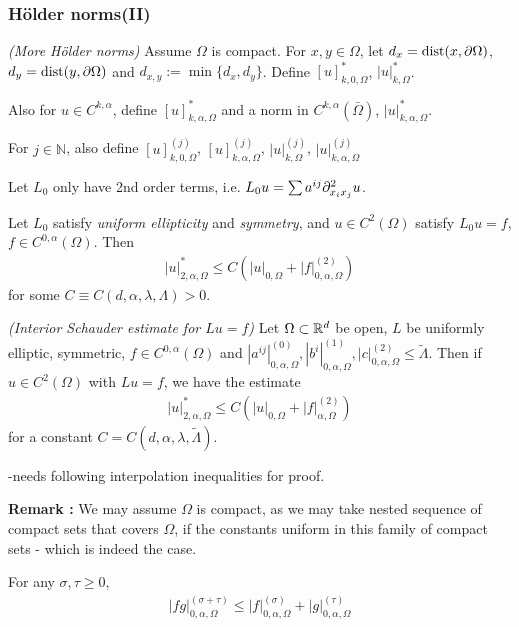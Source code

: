 \documentclass[10pt,a4paper]{article}
\begin{document}
\subsubsection*{H\"older norms(II)}

 \emph{(More H\"older norms)} Assume $\Omega$ is compact. For $x,y\in \Omega$, let $d_x = \text{dist}(x, \partial \Omega)$, $d_y = \text{dist}(y, \partial \Omega)$ and $d_{x,y} := \min \{d_x,d_y\}$. Define $[ u ]^*_{k,0, \Omega}$, $|u|^*_{k, \Omega}$.

\quad Also for $u\in C^{k, \alpha}$, define $[u]^*_{k, \alpha, \Omega}$ and a norm in $C^{k, \alpha}(\bar{\Omega})$, $|u|^*_{k, \alpha, \Omega}$.

\quad For $j\in \mathbb{N}$, also define $[u]^{(j)}_{k,0, \Omega}$, $[u]^{(j)}_{k, \alpha,\Omega}$, $|u|^{(j)}_{k,\Omega}$, $|u|^{(j)}_{k, \alpha, \Omega}$ 
\s

Let $L_0$ only have 2nd order terms, i.e. $L_0 u = \sum a^{ij} \partial^2_{x_i x_j} u$.
\s

 Let $L_0$ satisfy \emph{uniform ellipticity} and \emph{symmetry}, and $u\in C^2(\Omega)$ satisfy $L_0 u=f$, $f\in C^{0, \alpha}(\Omega)$. Then
\begin{align*}
|u|^*_{2, \alpha, \Omega} \leq C(|u|_{0, \Omega} + |f|^{(2)}_{0, \alpha, \Omega})
\end{align*}
for some $C \equiv C(d,\alpha, \lambda, \Lambda) >0$.
\s

 \emph{(Interior Schauder estimate for $Lu=f$)} Let $\Omega \subset \mathbb{R}^d$ be open, $L$ be uniformly elliptic, symmetric, $f\in C^{0, \alpha}(\Omega)$ and $|a^{ij}|^{(0)}_{0, \alpha, \Omega}, |b^i|^{(1)}_{0, \alpha, \Omega}, |c|^{(2)}_{0, \alpha, \Omega} \leq \tilde{\Lambda}$. Then if $u\in C^2(\Omega)$ with $Lu =f$, we have the estimate
\begin{align*}
|u|^*_{2, \alpha, \Omega} \leq C(|u|_{0, \Omega} + |f|^{(2)}_{\alpha, \Omega})
\end{align*}
for a constant $C= C(d, \alpha, \lambda, \tilde{\Lambda})$.

-needs following interpolation inequalities for proof.
\s

\textbf{Remark :} We may assume $\Omega$ is compact, as we may take nested sequence of compact sets that covers $\Omega$, if the constants uniform in this family of compact sets - which is indeed the case.
\s

 For any $\sigma,\tau \geq 0$,
\begin{align*}
|fg|^{(\sigma +\tau)}_{0, \alpha, \Omega}\leq |f|^{(\sigma)}_{0, \alpha, \Omega} + |g|^{(\tau)}_{0, \alpha, \Omega}
\end{align*}
\s
\end{document}
